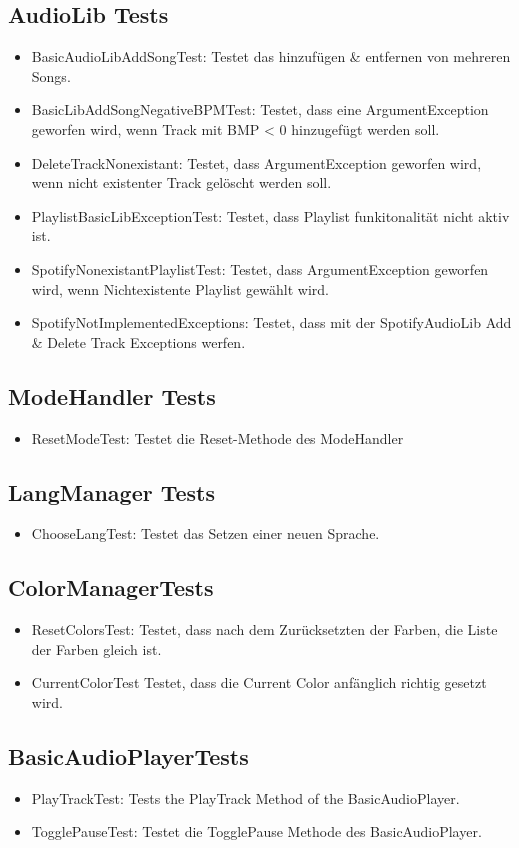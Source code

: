\documentclass[../validierung.tex]{subfiles}
\begin{document}
		\subsection{AudioLib Tests}
			\begin{itemize}
				\item BasicAudioLibAddSongTest: Testet das hinzufügen \& entfernen von mehreren Songs.
				\item BasicLibAddSongNegativeBPMTest: Testet, dass eine ArgumentException geworfen wird, wenn Track mit BMP < 0 hinzugefügt werden soll.
				\item DeleteTrackNonexistant: Testet, dass ArgumentException geworfen wird, wenn nicht existenter Track gelöscht werden soll.
				\item PlaylistBasicLibExceptionTest: Testet, dass Playlist funkitonalität nicht aktiv ist.
				\item SpotifyNonexistantPlaylistTest: Testet, dass ArgumentException geworfen wird, wenn Nichtexistente Playlist gewählt wird.
				\item SpotifyNotImplementedExceptions: Testet, dass mit der SpotifyAudioLib Add \& Delete Track Exceptions werfen.
			\end{itemize}
		\subsection{ModeHandler Tests}
			\begin{itemize}
				\item ResetModeTest: Testet die Reset-Methode des ModeHandler
			\end{itemize}
		\subsection{LangManager Tests}
			\begin{itemize}
				\item ChooseLangTest: Testet das Setzen einer neuen Sprache.
			\end{itemize}
		\subsection{ColorManagerTests}
			\begin{itemize}
				\item ResetColorsTest: Testet, dass nach dem Zurücksetzten der Farben, die Liste der Farben gleich ist.
				\item CurrentColorTest Testet, dass die Current Color anfänglich richtig gesetzt wird.
			\end{itemize}
		\subsection{BasicAudioPlayerTests}
			\begin{itemize}
				\item PlayTrackTest: Tests the PlayTrack Method of the BasicAudioPlayer.
				\item TogglePauseTest: Testet die TogglePause Methode des BasicAudioPlayer.
			\end{itemize}
\end{document}
